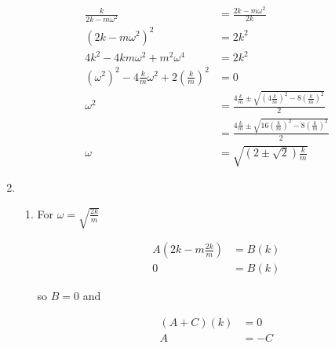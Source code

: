 \documentclass{article}
\begin{document}
\begin{enumerate}
        \begin{align*}
          \frac{k}{2 k - m \omega^2}                                             & = \frac{2 k - m \omega^2}{2 k}                                                                        \\
          (2 k - m \omega^2)^2                                                   & = 2 k^2                                                                                               \\
          4 k^2 - 4 k m \omega^2 + m^2 \omega^4                                  & = 2 k ^2                                                                                              \\
          (\omega^2)^2 - 4 \frac{k}{m} \omega^2 + 2 \left( \frac{k}{m} \right)^2 & = 0                                                                                                   \\
          \omega^2                                                               & = \frac{4 \frac{k}{m} \pm \sqrt{\left( 4 \frac{k}{m} \right)^2 - 8 \left( \frac{k}{m} \right)^2}}{2}  \\
                                                                                 & = \frac{4 \frac{k}{m} \pm \sqrt{16 \left( \frac{k}{m} \right)^2 - 8 \left( \frac{k}{m} \right)^2}}{2} \\
          \omega                                                                 & = \sqrt{(2 \pm \sqrt{2}) \frac{k}{m}}
        \end{align*}

  \item

        \begin{enumerate}
          \item For $\omega = \sqrt{\frac{2 k}{m}}$

                \begin{align*}
                  A \left( 2 k - m \frac{2 k}{m} \right) & = B (k) \\
                  0                                      & = B (k)
                \end{align*}

                so $B = 0$ and

                \begin{align*}
                  (A + C) (k) & = 0  \\
                  A           & = -C
                \end{align*}


\end{enumerate}
\end{enumerate}
\end{document}
